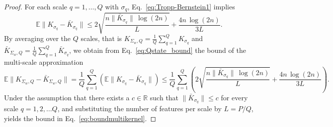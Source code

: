 \documentclass{article}
\begin{document}
\begin{proof}
For each scale $q=1,\ldots,Q$ with $\sigma_q$,  Eq.~\eqref{eq:Tropp-Bernstein1} implies
\begin{equation}
\mathbb{E} \big\| K_{\sigma_q} - \bar{K}_{\sigma_q} \big\| \le 
2\sqrt{\frac{n \|\bar{K}_{\sigma_q}\|\, \log(2n)}{L}}
+
\frac{4 n\, \log(2n)}{3 L}.
\label{eq:Qstate_bound}
\end{equation}
By averaging over the $Q$ scales, that is
$K_{\Sigma_w,Q}=\frac{1}{Q}\sum_{q=1}^Q K_{\sigma_q}$ and $ \bar{K}_{\Sigma_w,Q}=\frac{1}{Q}\sum_{q=1}^Q 
\bar{K}_{\sigma_q} $, we obtain from Eq.~\eqref{eq:Qstate_bound} the bound of the multi-scale approximation 
\begin{equation}
\mathbb{E} \big\| K_{\Sigma_w,Q} - \bar{K}_{\Sigma_w,Q} \big\| = \frac{1}{Q}\sum_{q=1}^Q\left(\mathbb{E} \big\| K_{\sigma_q} - \bar{K}_{\sigma_q} \big\| \right)
\le 
\frac{1}{Q}\sum_{q=1}^Q\left(
2\sqrt{\frac{n \|\bar{K}_{\sigma_q}\|\, \log(2n)}{L}}
+
\frac{4 n\, \log(2n)}{3 L}\right).
\end{equation}
Under the assumption that there exists a $c\in\mathbb{R}$ such that $ \|\bar{K}_{\sigma_q}\|\le c$ for every scale $q=1,2,\dots Q$, and substituting the number of features per scale by $L=P/Q$, yields the bound in Eq.~\eqref{eq:boundmultikernel}.
\end{proof}
\end{document}
